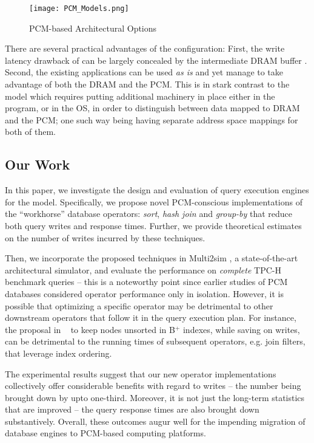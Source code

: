 \begin{figure}[htbp]
	\texttt{[image: PCM\_Models.png]}\centering
	\caption{PCM-based Architectural Options}
	\label{fig:pcm_models}
\end{figure}
 
There are several practical advantages of the \model{}
configuration: First,
the write latency drawback of \modelPcmRam{} can be largely concealed by the intermediate DRAM
buffer \cite{qureshi}. Second, the existing applications can be used \textit{as is} and yet manage to take advantage of both the DRAM and the PCM. This is in stark contrast to the \modelExplicit{} model which requires putting additional machinery in place either in the program, or in the OS, in order to distinguish between data mapped to DRAM and the PCM; one such way being having separate address space mappings for both of them.

\subsection*{Our Work}
In this paper, we investigate the design and evaluation of query execution engines for the \model{} model. Specifically, we propose novel PCM-conscious
implementations of the ``workhorse'' database operators: \textit{sort},
\textit{hash join} and \textit{group-by} that reduce both query writes and response times.  Further, we provide theoretical
estimates on the number of writes incurred by these techniques.

Then, we incorporate the proposed techniques in Multi2sim \cite{multi2sim},
a state-of-the-art architectural simulator, and evaluate the performance
on \emph{complete} TPC-H benchmark queries -- this is a noteworthy point since
earlier studies of PCM databases considered operator performance only
in isolation. However, it is possible that optimizing a specific operator
may be detrimental to other downstream operators that follow it in the query
execution plan. For instance, the proposal in ~\cite{chen} to keep nodes unsorted in
B$^+$ indexes, while saving on writes, can be detrimental
to the running times of subsequent operators, e.g. join filters, that 
leverage index ordering.

The experimental results suggest that our new operator implementations
collectively offer considerable benefits with regard to writes -- the number being brought
down by upto one-third.
Moreover, it is not just the long-term statistics that are improved --
the query response times are also brought down substantively.  Overall,
these outcomes augur well for the impending migration of database engines to PCM-based computing platforms.

